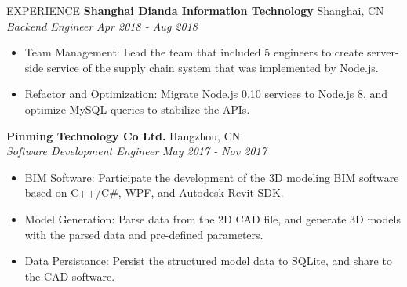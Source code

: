 \documentclass{resume} %
\begin{document}
\begin{rSection}{EXPERIENCE}
  \textbf{Shanghai Dianda Information Technology} \hfill Shanghai, CN\\
  \textit{Backend Engineer} \hfill \textit{Apr 2018 - Aug 2018}
  \begin{itemize}
    \itemsep -5pt {}
    \item Team Management: Lead the team that included 5 engineers to create server-side service of the supply chain system that was implemented by Node.js.
    \item Refactor and Optimization: Migrate Node.js 0.10 services to Node.js 8, and optimize MySQL queries to stabilize the APIs.
  \end{itemize}

  \textbf{Pinming Technology Co Ltd.} \hfill Hangzhou, CN\\
  \textit{Software Development Engineer} \hfill \textit{May 2017 - Nov 2017}
  \begin{itemize}
    \itemsep -5pt {}
    \item BIM Software: Participate the development of the 3D modeling BIM software based on C++/C\#, WPF, and Autodesk Revit SDK.
    \item Model Generation: Parse data from the 2D CAD file, and generate 3D models with the parsed data and pre-defined parameters.
    \item Data Persistance: Persist the structured model data to SQLite, and share to the CAD software.
  \end{itemize}

\end{rSection}
\end{document}
